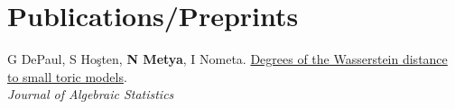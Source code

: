 %
%
%


\section{Publications/Preprints}





\begin{etaremune}[leftmargin=13pt]
\item {\color{grey}G DePaul, S Ho\c{s}ten, \textbf{N Metya}, I Nometa}. \href{https://arxiv.org/abs/2402.09626}{Degrees of the Wasserstein distance to small toric models}. \\
\textit{Journal of Algebraic Statistics}
\end{etaremune}
\vspace{\mygap}



